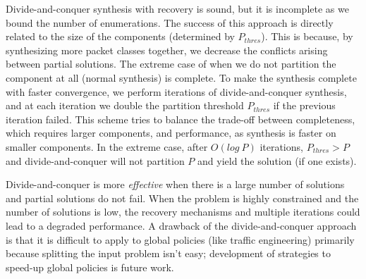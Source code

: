 Divide-and-conquer synthesis with recovery is sound, but 
it is incomplete as we bound the
number of enumerations. The success of this approach
is directly related to the size of the components (determined by $P_{thres}$). 
This is because, by synthesizing more packet classes together, we decrease the
conflicts arising between partial solutions. The extreme case of when we do not 
partition the component at all (normal synthesis) is complete. 
To make the synthesis complete with faster convergence, we
perform iterations of divide-and-conquer synthesis, and at each iteration we double the
partition threshold $P_{thres}$ if the previous iteration failed. 
This scheme tries to balance the trade-off between completeness, which
requires larger components, and performance, as synthesis is faster on smaller
components. 
In the extreme case, after $O(log~P)$
iterations, $P_{thres} > P$ and divide-and-conquer
will not partition $P$ and yield the solution (if one exists).
 
 Divide-and-conquer is more \emph{effective}
 when there is a large number of solutions and partial
 solutions do not fail. 
 When the problem is highly 
 constrained and the number of solutions is low, 
 the recovery mechanisms and multiple iterations could 
 lead to a degraded performance. 
A drawback of the divide-and-conquer approach is that it is 
 difficult to apply to global policies (like traffic engineering) primarily because
 splitting the input problem isn't easy; development
 of strategies to speed-up global policies is future work.

 
%
